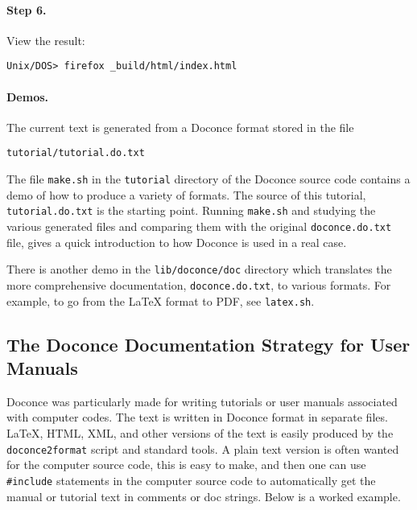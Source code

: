 \documentclass{article}
\begin{document}
\paragraph{Step 6.}
View the result:
\begin{Verbatim}[fontsize=\fontsize{9pt}{9pt},tabsize=8,baselinestretch=0.85,
fontfamily=tt,xleftmargin=7mm]
Unix/DOS> firefox _build/html/index.html
\end{Verbatim}
\noindent
\paragraph{Demos.}

The current text is generated from a Doconce format stored in the file
\begin{Verbatim}[fontsize=\fontsize{9pt}{9pt},tabsize=8,baselinestretch=0.85,
fontfamily=tt,xleftmargin=7mm]
tutorial/tutorial.do.txt
\end{Verbatim}
\noindent
The file {\fontsize{10pt}{10pt}\verb!make.sh!} in the {\fontsize{10pt}{10pt}\verb!tutorial!} directory of the
Doconce source code contains a demo of how to produce a variety of
formats.  The source of this tutorial, {\fontsize{10pt}{10pt}\verb!tutorial.do.txt!} is the
starting point.  Running {\fontsize{10pt}{10pt}\verb!make.sh!} and studying the various generated
files and comparing them with the original {\fontsize{10pt}{10pt}\verb!doconce.do.txt!} file,
gives a quick introduction to how Doconce is used in a real case.

There is another demo in the {\fontsize{10pt}{10pt}\verb!lib/doconce/doc!} directory which
translates the more comprehensive documentation, {\fontsize{10pt}{10pt}\verb!doconce.do.txt!}, to
various formats.  For example, to go from the LaTeX format to PDF, see
{\fontsize{10pt}{10pt}\verb!latex.sh!}.

\subsection*{The Doconce Documentation Strategy for User Manuals}

Doconce was particularly made for writing tutorials or user manuals
associated with computer codes. The text is written in Doconce format
in separate files. LaTeX, HTML, XML, and other versions of the text
is easily produced by the {\fontsize{10pt}{10pt}\verb!doconce2format!} script and standard tools.
A plain text version is often wanted for the computer source code,
this is easy to make, and then one can use
{\fontsize{10pt}{10pt}\verb!#include!} statements in the computer source code to automatically
get the manual or tutorial text in comments or doc strings.
Below is a worked example.
\end{document}
